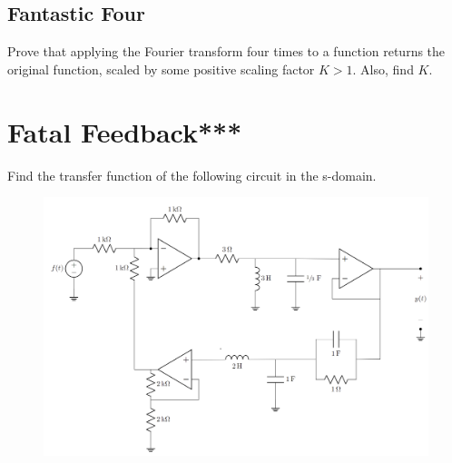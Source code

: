\documentclass{article}
\begin{document}
\subsection{Fantastic Four}
Prove that applying the Fourier transform four times to a function returns the original function, scaled by some positive scaling factor $K > 1$. Also, find $K$.

\vfill

\newpage


\section{Fatal Feedback***}

Find the transfer function of the following circuit in the s-domain.

\begin{figure}[ht!]
\centering
\includegraphics[width=0.8\linewidth]{figures/mega.png}
\end{figure}

\newpage
\end{document}

